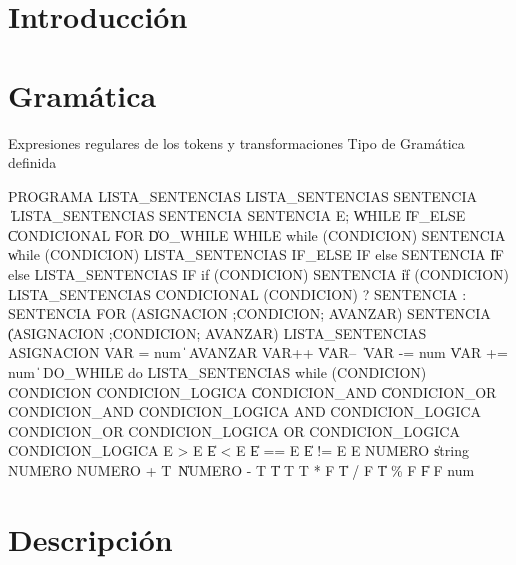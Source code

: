 \documentclass[10pt,a4paper]{article}
\begin{document}

\fecha{\today}



\maketitle

\tableofcontents

\newpage
\section{Introducción}

\section{Gramática}
Expresiones regulares de los tokens y transformaciones
Tipo de Gramática definida

PROGRAMA \leftarrow LISTA_SENTENCIAS
LISTA_SENTENCIAS \leftarrow SENTENCIA \| LISTA_SENTENCIAS SENTENCIA
SENTENCIA \leftarrow E; \| WHILE \| IF_ELSE \| CONDICIONAL \| FOR \| DO_WHILE
WHILE \leftarrow while (CONDICION) SENTENCIA \| while (CONDICION) {LISTA_SENTENCIAS}
IF_ELSE \leftarrow IF else SENTENCIA \| IF else {LISTA_SENTENCIAS}
IF \leftarrow if (CONDICION) SENTENCIA \| if (CONDICION) {LISTA_SENTENCIAS}
CONDICIONAL \leftarrow (CONDICION) ? SENTENCIA : SENTENCIA
FOR \leftarrow (ASIGNACION ;CONDICION; AVANZAR) SENTENCIA \| (ASIGNACION ;CONDICION; AVANZAR) {LISTA_SENTENCIAS}
ASIGNACION \leftarrow VAR = num \| \lambda
AVANZAR \leftarrow VAR++ \| VAR-- \| VAR -= num \| VAR += num \| \lambda
DO_WHILE \leftarrow do {LISTA_SENTENCIAS} while (CONDICION)
CONDICION \leftarrow CONDICION_LOGICA \| CONDICION_AND \| CONDICION_OR
CONDICION_AND \leftarrow CONDICION_LOGICA AND CONDICION_LOGICA
CONDICION_OR \leftarrow CONDICION_LOGICA OR CONDICION_LOGICA
CONDICION_LOGICA \leftarrow E > E \| E < E \| E == E \| E != E
E \leftarrow NUMERO \| string
NUMERO \leftarrow NUMERO + T \| NUMERO - T \| T
T \leftarrow T * F \| T / F \| T \% F \| F
F \leftarrow num



\section{Descripción}
\end{document}
